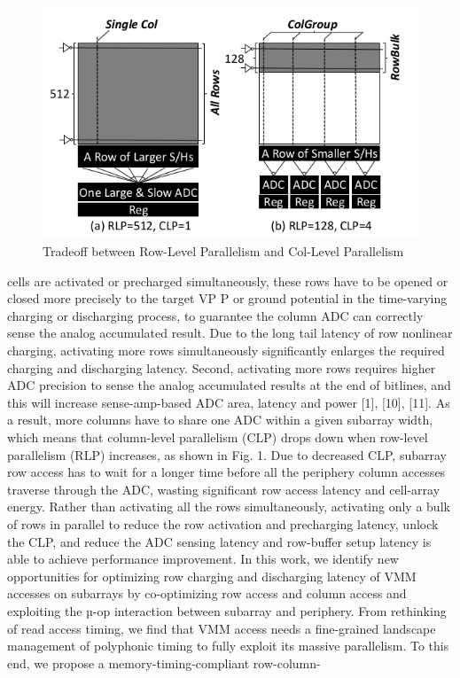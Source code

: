 \documentclass{article}
\begin{document}
 		\begin{figure}[h]
 			\centering
 			\includegraphics[width=0.7\linewidth]{images/fig1}
 			\caption{Tradeoff between Row-Level Parallelism and Col-Level Parallelism}
 			\label{fig:fig1}
 		\end{figure}

 		cells are activated or precharged simultaneously, these rows
 		have to be opened or closed more precisely to the target VP P
 		or ground potential in the time-varying charging or discharging
 		process, to guarantee the column ADC can correctly sense
 		the analog accumulated result. Due to the long tail latency of
 		row nonlinear charging, activating more rows simultaneously
 		significantly enlarges the required charging and discharging
 		latency. Second, activating more rows requires higher ADC
 		precision to sense the analog accumulated results at the end
 		of bitlines, and this will increase sense-amp-based ADC area,
 		latency and power [1], [10], [11]. As a result, more columns
 		have to share one ADC within a given subarray width, which
 		means that column-level parallelism (CLP) drops down when
 		row-level parallelism (RLP) increases, as shown in Fig. 1. Due
 		to decreased CLP, subarray row access has to wait for a longer
 		time before all the periphery column accesses traverse through
 		the ADC, wasting significant row access latency and cell-array
 		energy. Rather than activating all the rows simultaneously,
 		activating only a bulk of rows in parallel to reduce the row
 		activation and precharging latency, unlock the CLP, and reduce
 		the ADC sensing latency and row-buffer setup latency is able
 		to achieve performance improvement.
 		In this work, we identify new opportunities for optimizing
 		row charging and discharging latency of VMM accesses on
 		subarrays by co-optimizing row access and column access
 		and exploiting the µ-op interaction between subarray and
 		periphery. From rethinking of read access timing, we find that
 		VMM access needs a fine-grained landscape management of
 		polyphonic timing to fully exploit its massive parallelism. To
 		this end, we propose a memory-timing-compliant row-column-
 		
\end{document}
